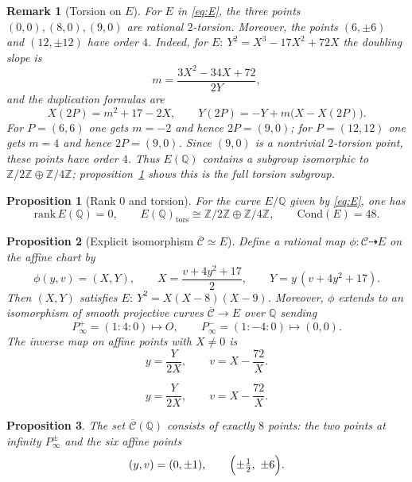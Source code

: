 \documentclass[10pt,a4paper]{amsart}
\newtheorem{remark}{Remark}
\newtheorem{proposition}{Proposition}
\begin{document}
\begin{remark}[Torsion on $E$]\label{rem:tors}
For $E$ in \eqref{eq:E}, the three points $(0,0),(8,0),(9,0)$ are rational $2$-torsion.
Moreover, the points $(6,\pm 6)$ and $(12,\pm 12)$ have order $4$.
Indeed, for $E:\ Y^2=X^3-17X^2+72X$ the doubling slope is
\[
m=\frac{3X^2-34X+72}{2Y},
\]
and the duplication formulas are
\[
X(2P)=m^2+17-2X,\qquad Y(2P)=-Y+m\bigl(X-X(2P)\bigr).
\]
For $P=(6,6)$ one gets $m=-2$ and hence $2P=(9,0)$; for $P=(12,12)$ one gets $m=4$ and hence $2P=(9,0)$.
Since $(9,0)$ is a nontrivial $2$-torsion point, these points have order $4$.
Thus $E(\mathbb{Q})$ contains a subgroup isomorphic to $\mathbb{Z}/2\mathbb{Z}\oplus\mathbb{Z}/4\mathbb{Z}$; proposition~\ref{prop:rank0} shows this is the full torsion subgroup.
\end{remark}

\begin{proposition}[Rank $0$ and torsion]\label{prop:rank0}
For the curve $E/\mathbb{Q}$ given by \eqref{eq:E}, one has
\[
\mathrm{rank}\,E(\mathbb{Q})=0,\qquad
E(\mathbb{Q})_{\mathrm{tors}}\cong \mathbb{Z}/2\mathbb{Z}\oplus\mathbb{Z}/4\mathbb{Z},\qquad
\mathrm{Cond}(E)=48.
\]
\end{proposition}

\begin{proposition}[Explicit isomorphism $\overline{\mathcal{C}}\simeq E$]\label{prop:CEiso}
Define a rational map $\phi:\mathcal{C}\dashrightarrow E$ on the affine chart by
\begin{equation}\label{eq:phi}
\phi(y,v)=(X,Y),\qquad
X=\frac{v+4y^2+17}{2},\qquad
Y=y\,(v+4y^2+17).
\end{equation}
Then $(X,Y)$ satisfies $E:\ Y^2=X(X-8)(X-9)$. Moreover, $\phi$ extends to an isomorphism of smooth projective curves $\overline{\mathcal{C}}\to E$ over $\mathbb{Q}$ sending
\[
P_\infty^+=(1:4:0)\longmapsto O,\qquad
P_\infty^-=(1:-4:0)\longmapsto (0,0).
\]
The inverse map on affine points with $X\neq0$ is
\begin{equation}\label{eq:phi_inv}
y=\frac{Y}{2X},\qquad v=X-\frac{72}{X}.
\end{equation}
\end{proposition}

\begin{equation}
y=\frac{Y}{2X},\qquad v=X-\frac{72}{X}.
\end{equation}

\begin{proposition}\label{prop:Cpoints}
The set $\overline{\mathcal{C}}(\mathbb{Q})$ consists of exactly $8$ points: the two points at infinity $P_\infty^\pm$ and the six affine points
\[
(y,v)=(0,\pm1),\qquad \Bigl(\pm\tfrac12,\ \pm6\Bigr).
\]
\end{proposition}
\end{document}
